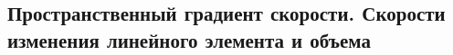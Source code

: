 

\subsection{Пространственный градиент скорости. Скорости изменения линейного элемента и объема}



